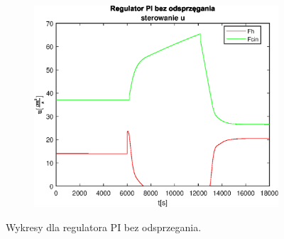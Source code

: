 \begin{figure}[h!]
   \begin{subfigure}[b]{0.4\textwidth}
      \includegraphics[width=1\linewidth]{img/PI/noDecoupler/noDisturbance/PINoDecouplerControl1Linfalse.eps}
      \caption{}
      \label{fig:fig:PINodDecoupler1Linfalse3}
   \end{subfigure}
       
   \caption{Wykresy dla regulatora PI bez odsprzegania.}
   \label{fig:PINodDecoupler1Linfalse}
\end{figure}
           
